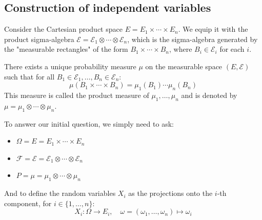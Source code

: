 \subsection{Construction of independent variables}
Consider the Cartesian product space $E = E_1 \times \cdots \times E_n$. We equip it with the product sigma-algebra $\mathcal{E} = \mathcal{E}_1 \otimes \cdots \otimes \mathcal{E}_n$, which is the sigma-algebra generated by the "measurable rectangles" of the form $B_1 \times \cdots \times B_n$, where $B_i \in \mathcal{E}_i$ for each $i$.%
\begin{theorem}
There exists a unique probability measure $\mu$ on the measurable space $(E, \mathcal{E})$ such that for all $B_1 \in \mathcal{E}_1, \ldots, B_n \in \mathcal{E}_n$:
\[ \mu(B_1 \times \cdots \times B_n) = \mu_1(B_1) \cdots \mu_n(B_n) \]
This measure is called the product measure of $\mu_1, \ldots, \mu_n$ and is denoted by $\mu = \mu_1 \otimes \cdots \otimes \mu_n$.
\end{theorem}%
To answer our initial question, we simply need to ask:%
\begin{itemize}
    \item $\Omega = E = E_1 \times \cdots \times E_n$
    \item $\mathcal{F} = \mathcal{E} = \mathcal{E}_1 \otimes \cdots \otimes \mathcal{E}_n$
    \item $P = \mu = \mu_1 \otimes \cdots \otimes \mu_n$
\end{itemize}%
And to define the random variables $X_i$ as the projections onto the $i$-th component, for $i \in \{1, \ldots, n\}$:
\[ X_i: \Omega \to E_i, \quad \omega = (\omega_1, \ldots, \omega_n) \mapsto \omega_i \]%
